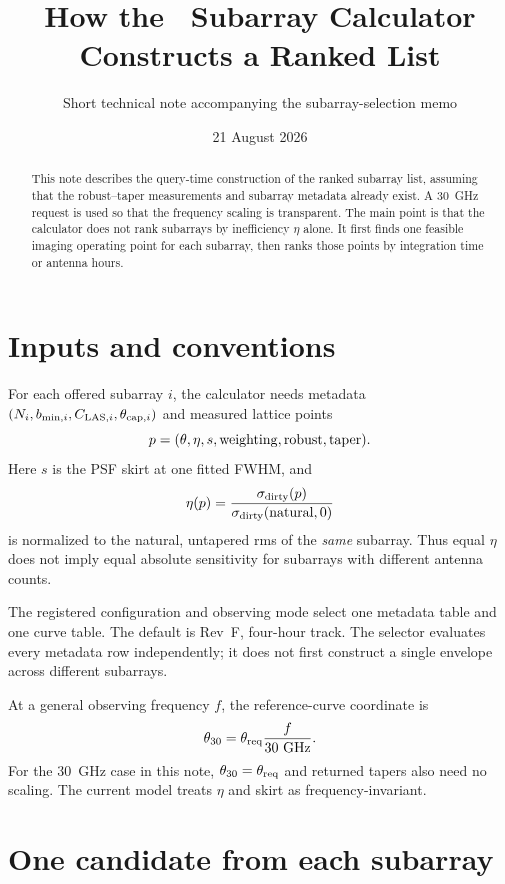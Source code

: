 \documentclass[11pt]{article}
\title{How the \ngvla\ Subarray Calculator Constructs a Ranked List}
\author{Short technical note accompanying the subarray-selection memo}
\date{21 August 2026}
\begin{document}
\maketitle

\begin{abstract}
This note describes the query-time construction of the ranked subarray list,
assuming that the robust--taper measurements and subarray metadata already
exist.  A 30~GHz request is used so that the frequency scaling is transparent.
The main point is that the calculator does not rank subarrays by inefficiency
$\eta$ alone.  It first finds one feasible imaging operating point for each
subarray, then ranks those points by integration time or antenna hours.
\end{abstract}

\section{Inputs and conventions}

For each offered subarray $i$, the calculator needs metadata
$(N_i,b_{\min,i},C_{{\rm LAS},i},\theta_{{\rm cap},i})$ and measured lattice
points
\[
  p=(\theta,\eta,s,{\rm weighting},{\rm robust},{\rm taper}).
\]
Here $s$ is the PSF skirt at one fitted FWHM, and
\begin{equation}
  \eta(p)=\frac{\sigma_{\rm dirty}(p)}
  {\sigma_{\rm dirty}({\rm natural},0)}
\end{equation}
is normalized to the natural, untapered rms of the \emph{same} subarray.
Thus equal $\eta$ does not imply equal absolute sensitivity for subarrays with
different antenna counts.

The registered configuration and observing mode select one metadata table and
one curve table.  The default is Rev~F, four-hour track.  The selector evaluates
every metadata row independently; it does not first construct a single envelope
across different subarrays.

At a general observing frequency $f$, the reference-curve coordinate is
\[
  \theta_{30}=\theta_{\rm req}\frac{f}{30~{\rm GHz}}.
\]
For the 30~GHz case in this note, $\theta_{30}=\theta_{\rm req}$ and returned
tapers also need no scaling.  The current model treats $\eta$ and skirt as
frequency-invariant.

\section{One candidate from each subarray}
\end{document}
